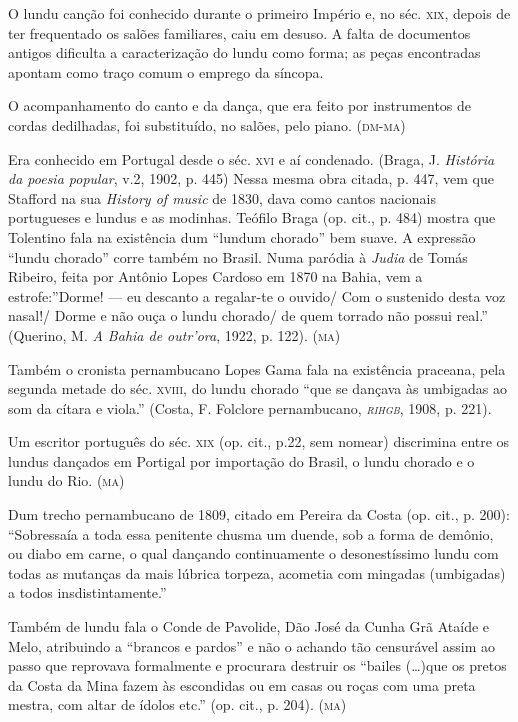 O lundu canção foi conhecido durante o primeiro Império e, no séc. \textsc{xix},
depois de ter frequentado os salões familiares, caiu em desuso. A falta
de documentos antigos dificulta a caracterização do lundu como forma; as
peças encontradas apontam como traço comum o emprego da síncopa.

O acompanhamento do canto e da dança, que era feito por instrumentos de
cordas dedilhadas, foi substituído, no salões, pelo piano. (\textsc{dm-ma})

Era conhecido em Portugal desde o séc. \textsc{xvi} e aí condenado. (Braga, J.
\emph{História da poesia popular}, v.2, 1902, p. 445) Nessa mesma obra
citada, p. 447, vem que Stafford na sua \emph{History of music} de 1830,
dava como cantos nacionais portugueses e lundus e as modinhas. Teófilo
Braga (op. cit., p. 484) mostra que Tolentino fala na existência dum
``lundum chorado'' bem suave. A expressão ``lundu chorado'' corre também
no Brasil. Numa paródia à \emph{Judia} de Tomás Ribeiro, feita por
Antônio Lopes Cardoso em 1870 na Bahia, vem a estrofe:''Dorme! --- eu
descanto a regalar-te o ouvido/ Com o sustenido desta voz nasal!/ Dorme
e não ouça o lundu chorado/ de quem torrado não possui real.'' (Querino,
M. \emph{A Bahia de outr'ora}, 1922, p. 122). (\textsc{ma})

Também o cronista pernambucano Lopes Gama fala na existência praceana,
pela segunda metade do séc. \textsc{xviii}, do lundu chorado ``que se dançava às
umbigadas ao som da cítara e viola.'' (Costa, F. Folclore pernambucano,
\emph{\textsc{rihgb}}, 1908, p. 221).

Um escritor português do séc. \textsc{xix} (op. cit., p.22, sem nomear)
discrimina entre os lundus dançados em Portigal por importação do
Brasil, o lundu chorado e o lundu do Rio. (\textsc{ma})

Dum trecho pernambucano de 1809, citado em Pereira da Costa (op. cit.,
p. 200): ``Sobressaía a toda essa penitente chusma um duende, sob a
forma de demônio, ou diabo em carne, o qual dançando continuamente o
desonestíssimo lundu com todas as mutanças da mais lúbrica torpeza,
acometia com mingadas (umbigadas) a todos insdistintamente.''

Também de lundu fala o Conde de Pavolide, Dão José da Cunha Grã Ataíde e
Melo, atribuindo a ``brancos e pardos'' e não o achando tão censurável
assim ao passo que reprovava formalmente e procurara destruir os
``bailes (\ldots{})que os pretos da Costa da Mina fazem às escondidas ou em
casas ou roças com uma preta mestra, com altar de ídolos etc.'' (op.
cit., p. 204). (\textsc{ma})

